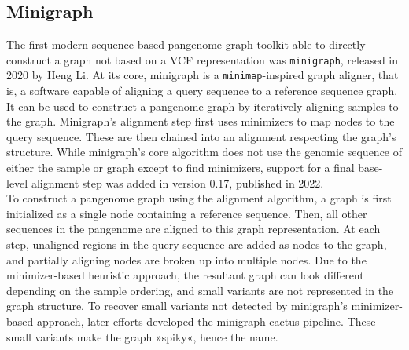 \subsection*{Minigraph}
The first modern sequence-based pangenome graph toolkit able to directly construct a graph not based on a VCF representation was \texttt{minigraph}, released in 2020 by Heng Li\cite{minigraph}.
At its core, minigraph is a \texttt{minimap}-inspired graph aligner, that is, a software capable of aligning a query sequence to a reference sequence graph.
It can be used to construct a pangenome graph by iteratively aligning samples to the graph. %
Minigraph's alignment step first uses minimizers to map nodes to the query sequence.
These are then chained into an alignment respecting the graph's structure.
While minigraph's core algorithm does not use the genomic sequence of either the sample or graph except to find minimizers, support for a final base-level alignment step was added in version 0.17, published in 2022\cite{minigraph017}.\\
To construct a pangenome graph using the alignment algorithm, a graph is first initialized as a single node containing a reference sequence.
Then, all other sequences in the pangenome are aligned to this graph representation.
At each step, unaligned regions in the query sequence are added as nodes to the graph, and partially aligning nodes are broken up into multiple nodes.
Due to the minimizer-based heuristic approach, the resultant graph can look different depending on the sample ordering, and small variants are not represented in the graph structure.
To recover small variants not detected by minigraph's minimizer-based approach, later efforts developed the minigraph-cactus pipeline\cite{hickey24}.
These small variants make the graph »spiky«, hence the name.
\\%
